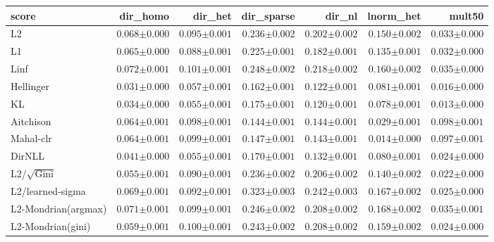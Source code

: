 \begin{tabular}{lrrrrrr}
\toprule
score & dir\_homo & dir\_het & dir\_sparse & dir\_nl & lnorm\_het & mult50 \\
\midrule
L2 & $0.068{\scriptstyle\pm0.000}$ & $0.095{\scriptstyle\pm0.001}$ & $0.236{\scriptstyle\pm0.002}$ & $0.202{\scriptstyle\pm0.002}$ & $0.150{\scriptstyle\pm0.002}$ & $0.033{\scriptstyle\pm0.000}$ \\
L1 & $0.065{\scriptstyle\pm0.000}$ & $0.088{\scriptstyle\pm0.001}$ & $0.225{\scriptstyle\pm0.001}$ & $0.182{\scriptstyle\pm0.001}$ & $0.135{\scriptstyle\pm0.001}$ & $0.032{\scriptstyle\pm0.000}$ \\
Linf & $0.072{\scriptstyle\pm0.001}$ & $0.101{\scriptstyle\pm0.001}$ & $0.248{\scriptstyle\pm0.002}$ & $0.218{\scriptstyle\pm0.002}$ & $0.160{\scriptstyle\pm0.002}$ & $0.035{\scriptstyle\pm0.000}$ \\
Hellinger & $\mathbf{0.031}{\scriptstyle\pm0.000}$ & $0.057{\scriptstyle\pm0.001}$ & $0.162{\scriptstyle\pm0.001}$ & $0.122{\scriptstyle\pm0.001}$ & $0.081{\scriptstyle\pm0.001}$ & $0.016{\scriptstyle\pm0.000}$ \\
KL & $0.034{\scriptstyle\pm0.000}$ & $0.055{\scriptstyle\pm0.001}$ & $0.175{\scriptstyle\pm0.001}$ & $\mathbf{0.120}{\scriptstyle\pm0.001}$ & $0.078{\scriptstyle\pm0.001}$ & $\mathbf{0.013}{\scriptstyle\pm0.000}$ \\
Aitchison & $0.064{\scriptstyle\pm0.001}$ & $0.098{\scriptstyle\pm0.001}$ & $\mathbf{0.144}{\scriptstyle\pm0.001}$ & $0.144{\scriptstyle\pm0.001}$ & $0.029{\scriptstyle\pm0.001}$ & $0.098{\scriptstyle\pm0.001}$ \\
Mahal-clr & $0.064{\scriptstyle\pm0.001}$ & $0.099{\scriptstyle\pm0.001}$ & $0.147{\scriptstyle\pm0.001}$ & $0.143{\scriptstyle\pm0.001}$ & $\mathbf{0.014}{\scriptstyle\pm0.000}$ & $0.097{\scriptstyle\pm0.001}$ \\
DirNLL & $0.041{\scriptstyle\pm0.000}$ & $\mathbf{0.055}{\scriptstyle\pm0.001}$ & $0.170{\scriptstyle\pm0.001}$ & $0.132{\scriptstyle\pm0.001}$ & $0.080{\scriptstyle\pm0.001}$ & $0.024{\scriptstyle\pm0.000}$ \\
L2/$\sqrt{\mathrm{Gini}}$ & $0.055{\scriptstyle\pm0.001}$ & $0.090{\scriptstyle\pm0.001}$ & $0.236{\scriptstyle\pm0.002}$ & $0.206{\scriptstyle\pm0.002}$ & $0.140{\scriptstyle\pm0.002}$ & $0.022{\scriptstyle\pm0.000}$ \\
L2/learned-sigma & $0.069{\scriptstyle\pm0.001}$ & $0.092{\scriptstyle\pm0.001}$ & $0.323{\scriptstyle\pm0.003}$ & $0.242{\scriptstyle\pm0.003}$ & $0.167{\scriptstyle\pm0.002}$ & $0.025{\scriptstyle\pm0.000}$ \\
L2-Mondrian(argmax) & $0.071{\scriptstyle\pm0.001}$ & $0.099{\scriptstyle\pm0.001}$ & $0.246{\scriptstyle\pm0.002}$ & $0.208{\scriptstyle\pm0.002}$ & $0.168{\scriptstyle\pm0.002}$ & $0.035{\scriptstyle\pm0.001}$ \\
L2-Mondrian(gini) & $0.059{\scriptstyle\pm0.001}$ & $0.100{\scriptstyle\pm0.001}$ & $0.243{\scriptstyle\pm0.002}$ & $0.208{\scriptstyle\pm0.002}$ & $0.159{\scriptstyle\pm0.002}$ & $0.024{\scriptstyle\pm0.000}$ \\
\bottomrule
\end{tabular}